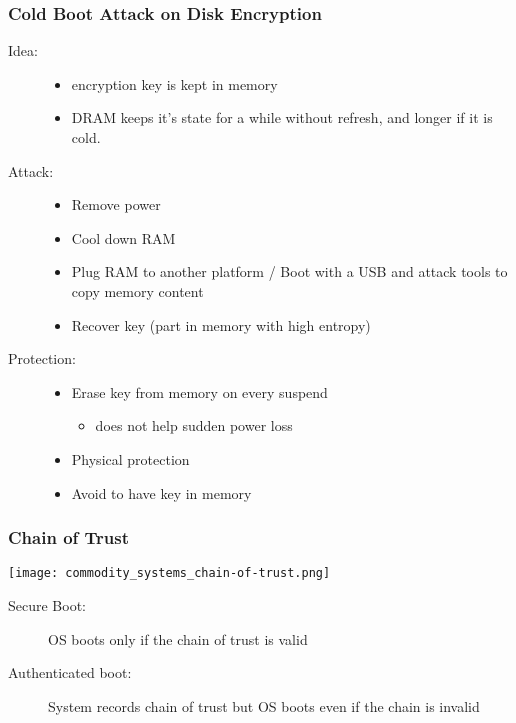 \subsubsection{Cold Boot Attack on Disk Encryption}
\begin{description}
  \item[Idea:] \hfill
    \begin{itemize}
      \item encryption key is kept in memory
      \item DRAM keeps it's state for a while without refresh, and
	longer if it is cold.
    \end{itemize}
  \item[Attack:] \hfill
    \begin{itemize}
      \item Remove power
      \item Cool down RAM
      \item Plug RAM to another platform / Boot with a USB and attack
	tools to copy memory content
      \item Recover key (part in memory with high entropy)
    \end{itemize}
  \item[Protection:] \hfill
    \begin{itemize}
      \item Erase key from memory on every suspend
	\begin{itemize}
	  \item does not help sudden power loss
	\end{itemize}
      \item Physical protection
      \item Avoid to have key in memory
    \end{itemize}
\end{description}


\subsubsection{Chain of Trust}
\begin{center}
  \texttt{[image: commodity\_systems\_chain-of-trust.png]}
\end{center}
\begin{description}
  \item[Secure Boot:] OS boots only if the chain of trust is valid
  \item[Authenticated boot:] System records chain of trust but OS boots
    even if the chain is invalid
\end{description}


